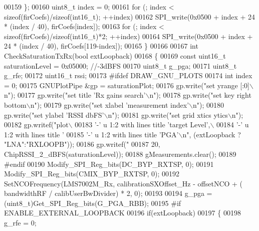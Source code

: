 \begin{DoxyCode}
{00159     \};
00160     uint8\_t index = 0;
00161     \textcolor{keywordflow}{for} (; index < \textcolor{keyword}{sizeof}(firCoefs)/\textcolor{keyword}{sizeof}(int16\_t); ++index)
00162         SPI_write(0x0500 + index + 24 * (index / 40), firCoefs[index]);
00163     \textcolor{keywordflow}{for} (; index < \textcolor{keyword}{sizeof}(firCoefs)/\textcolor{keyword}{sizeof}(int16\_t)*2; ++index)
00164         SPI_write(0x0500 + index + 24 * (index / 40), firCoefs[119-index]);
00165 \}
00166 
00167 \textcolor{keywordtype}{int} CheckSaturationTxRx(\textcolor{keywordtype}{bool} extLoopback)
00168 \{
00169     \textcolor{keyword}{const} uint16\_t saturationLevel = 0x05000; \textcolor{comment}{//-3dBFS}
00170     uint8\_t g\_pga;
00171     uint8\_t g\_rfe;
00172     uint16\_t rssi;
00173 \textcolor{preprocessor}{#ifdef DRAW\_GNU\_PLOTS}
00174     \textcolor{keywordtype}{int} index = 0;
00175     GNUPlotPipe &gp = saturationPlot;
00176     gp.write(\textcolor{stringliteral}{"set yrange [:0]\(\backslash\)n"});
00177     gp.write(\textcolor{stringliteral}{"set title 'Rx gains search'\(\backslash\)n"});
00178     gp.write(\textcolor{stringliteral}{"set key right bottom\(\backslash\)n"});
00179     gp.write(\textcolor{stringliteral}{"set xlabel 'measurement index'\(\backslash\)n"});
00180     gp.write(\textcolor{stringliteral}{"set ylabel 'RSSI dbFS'\(\backslash\)n"});
00181     gp.write(\textcolor{stringliteral}{"set grid xtics ytics\(\backslash\)n"});
00182     gp.writef(\textcolor{stringliteral}{"plot\(\backslash\)}
00183 \textcolor{stringliteral}{'-' u 1:2 with lines title 'target Level',\(\backslash\)}
00184 \textcolor{stringliteral}{'-' u 1:2 with lines title '%
00185 \textcolor{stringliteral}{'-' u 1:2 with lines title 'PGA'\(\backslash\)n"}, (extLoopback ? \textcolor{stringliteral}{"LNA"}:\textcolor{stringliteral}{"RXLOOPB"}));
00186     gp.writef(\textcolor{stringliteral}{"%
00187                               20, ChipRSSI\_2\_dBFS(saturationLevel));
00188     gMeasurements.clear();
00189 \textcolor{preprocessor}{#endif}
00190     Modify_SPI_Reg_bits(DC_BYP_RXTSP, 0);
00191     Modify_SPI_Reg_bits(CMIX_BYP_RXTSP, 0);
00192     SetNCOFrequency(LMS7002M_Rx, calibrationSXOffset_Hz - offsetNCO + (
      bandwidthRF / calibUserBwDivider) * 2, 0);
00193 
00194     g\_pga = (uint8\_t)Get_SPI_Reg_bits(G_PGA_RBB);
00195 \textcolor{preprocessor}{#if ENABLE\_EXTERNAL\_LOOPBACK}
00196     \textcolor{keywordflow}{if}(extLoopback)
00197     \{
00198         g\_rfe = 0;
}}}
\end{DoxyCode}
